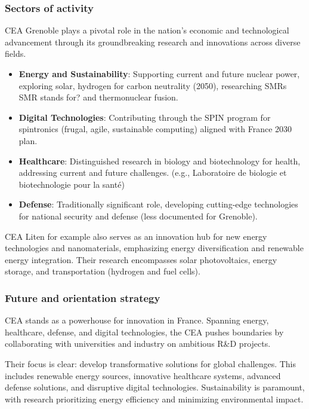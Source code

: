 \subsubsection{Sectors of activity}

CEA Grenoble plays a pivotal role in the nation's economic and technological 
advancement through its groundbreaking research and innovations across diverse fields.

\begin{itemize}
  \item \textbf{Energy and Sustainability}: Supporting current and future nuclear power, exploring solar, hydrogen for carbon
   neutrality (2050), researching SMRs \color{red} SMR stands for? \color{black} and thermonuclear fusion.
  \item \textbf{Digital Technologies}: Contributing through the SPIN program for spintronics (frugal, agile, sustainable computing)
   aligned with France 2030 plan.
  \item \textbf{Healthcare}: Distinguished research in biology and biotechnology for health, addressing current and future challenges.
   (e.g., Laboratoire de biologie et biotechnologie pour la santé)
  \item \textbf{Defense}: Traditionally significant role, developing cutting-edge technologies for national security and defense 
  (less documented for Grenoble).
\end{itemize}

CEA Liten for example also serves as an innovation hub for new energy technologies and nanomaterials, emphasizing energy diversification
 and renewable energy integration. Their research encompasses solar photovoltaics, energy storage, and transportation (hydrogen and fuel
 cells).


\subsubsection{Future and orientation strategy}

\medskip

 CEA stands as a powerhouse for innovation in France.
 Spanning energy, healthcare, defense, and digital technologies, the CEA pushes boundaries by collaborating with universities
 and industry on ambitious R\&D projects.

\medskip

Their focus is clear: develop transformative solutions for global challenges. 
 This includes renewable energy sources, innovative healthcare systems, advanced defense solutions, 
 and disruptive digital technologies. Sustainability is paramount, with research prioritizing energy 
 efficiency and minimizing environmental impact.


